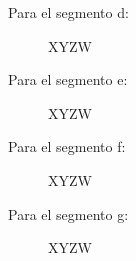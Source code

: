   Para el segmento d:
  \begin{figure}[H]
    \begin{center}
      \begin{Karnaugh}{X}{Y}{Z}{W}
      \end{Karnaugh}
    \end{center}
  \end{figure}

  Para el segmento e:
  \begin{figure}[H]
    \begin{center}
      \begin{Karnaugh}{X}{Y}{Z}{W}
      \end{Karnaugh}
    \end{center}
  \end{figure}

  Para el segmento f:
  \begin{figure}[H]
    \begin{center}
      \begin{Karnaugh}{X}{Y}{Z}{W}
      \end{Karnaugh}
    \end{center}
  \end{figure}

  Para el segmento g:
  \begin{figure}[H]
    \begin{center}
      \begin{Karnaugh}{X}{Y}{Z}{W}
      \end{Karnaugh}
    \end{center}
  \end{figure}
